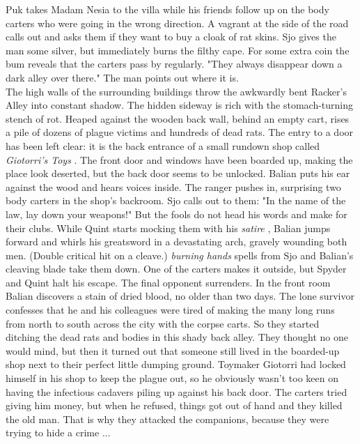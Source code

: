 Puk takes Madam Nesia to the villa while his friends follow up on the body carters who were going in the wrong direction. A vagrant at the side of the road calls out and asks them if they want to buy a cloak of rat skins. Sjo gives the man some silver, but immediately burns the filthy cape. For some extra coin the bum reveals that the carters pass by regularly. "They always disappear down a dark alley over there." The man points out where it is.\\

The high walls of the surrounding buildings throw the awkwardly bent Racker's Alley into constant shadow. The hidden sideway is rich with the stomach-turning stench of rot. Heaped against the wooden back wall, behind an empty cart, rises a pile of dozens of plague victims and hundreds of dead rats. The entry to a door has been left clear: it is the back entrance of a small rundown shop called {\itshape Giotorri's Toys} . The front door and windows have been boarded up, making the place look deserted, but the back door seems to be unlocked. Balian puts his ear against the wood and hears voices inside. The ranger pushes in, surprising two body carters in the shop's backroom. Sjo calls out to them: "In the name of the law, lay down your weapons!" But the fools do not head his words and make for their clubs. While Quint starts mocking them with his {\itshape satire} , Balian jumps forward and whirls his greatsword in a devastating arch, gravely wounding both men. (Double critical hit on a cleave.)  {\itshape burning hands} spells from Sjo and Balian's cleaving blade take them down. One of the carters makes it outside, but Spyder and Quint halt his escape. The final opponent surrenders. In the front room Balian discovers a stain of dried blood, no older than two days. The lone survivor confesses that he and his colleagues were tired of making the many long runs from north to south across the city with the corpse carts. So they started ditching the dead rats and bodies in this shady back alley. They thought no one would mind, but then it turned out that someone still lived in the boarded-up shop next to their perfect little dumping ground. Toymaker Giotorri had locked himself in his shop to keep the plague out, so he obviously wasn't too keen on having the infectious cadavers piling up against his back door. The carters tried giving him money, but when he refused, things got out of hand and they killed the old man. That is why they attacked the companions, because they were trying to hide a crime ...\\

